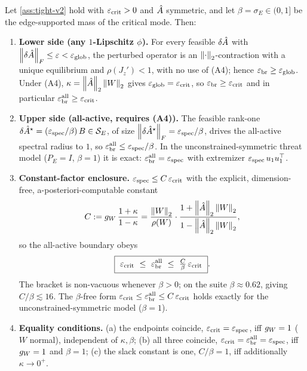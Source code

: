 \begin{theorem}
\label{thm:cf2s_full}
Let \cref{ass:tight-v2} hold with $\varepsilon_{\mathrm{crit}}>0$ and $\hat{A}$ symmetric, and let $\beta=\sigma_E\in(0,1]$ be
the edge-supported mass of the critical mode. Then:
\begin{enumerate}
\item[\textnormal{(i)}] \textbf{Lower side (any $1$-Lipschitz $\phi$).} For every feasible
$\delta\hat{A}$ with $\left\|\delta\hat{A}\right\|_F\le\varepsilon<\varepsilon_{\mathrm{glob}}$, the perturbed operator is an
$\left\|\cdot\right\|_2$-contraction with a unique equilibrium and $\rho(J_z')<1$, with no use of (A4); hence
$\varepsilon_{\mathrm{br}}\ge\varepsilon_{\mathrm{glob}}$. Under (A4), $\kappa=\left\|\hat{A}\right\|_2\left\|W\right\|_2$ gives $\varepsilon_{\mathrm{glob}}=\varepsilon_{\mathrm{crit}}$, so
$\varepsilon_{\mathrm{br}}\ge\varepsilon_{\mathrm{crit}}$ and in particular $\varepsilon_{\mathrm{br}}^{\mathrm{all}}\ge\varepsilon_{\mathrm{crit}}$.

\item[\textnormal{(ii)}] \textbf{Upper side (all-active, requires (A4)).} The feasible rank-one
$\delta\hat{A}^\star=(\varepsilon_{\mathrm{spec}}/\beta)\,B\in\mathcal S_E$, of size $\left\|\delta\hat{A}^\star\right\|_F=\varepsilon_{\mathrm{spec}}/\beta$,
drives the all-active spectral radius to $1$, so $\varepsilon_{\mathrm{br}}^{\mathrm{all}}\le\varepsilon_{\mathrm{spec}}/\beta$. In the
unconstrained-symmetric threat model ($P_E=I$, $\beta=1$) it is exact: $\varepsilon_{\mathrm{br}}^{\mathrm{all}}=\varepsilon_{\mathrm{spec}}$ with
extremizer $\varepsilon_{\mathrm{spec}}\,u_1u_1^\top$.

\item[\textnormal{(iii)}] \textbf{Constant-factor enclosure.} $\varepsilon_{\mathrm{spec}}\le C\,\varepsilon_{\mathrm{crit}}$ with the explicit,
dimension-free, a-posteriori-computable constant
\begin{equation*}
C:=g_W\,\frac{1+\kappa}{1-\kappa}
=\frac{\left\|W\right\|_2}{\rho(W)}\cdot\frac{1+\left\|\hat{A}\right\|_2\left\|W\right\|_2}{1-\left\|\hat{A}\right\|_2\left\|W\right\|_2},
\end{equation*}
so the all-active boundary obeys
\begin{equation}
\boxed{\ \ecrit\ \le\ \ebreakall\ \le\ \tfrac{C}{\beta}\,\ecrit\ }.
\label{eq:bracket_full}
\end{equation}
The bracket is non-vacuous whenever $\beta>0$; on the suite $\beta\approx0.62$, giving
$C/\beta\lesssim16$. The $\beta$-free form $\varepsilon_{\mathrm{crit}}\le\varepsilon_{\mathrm{br}}^{\mathrm{all}}\le C\,\varepsilon_{\mathrm{crit}}$ holds exactly for the
unconstrained-symmetric model ($\beta=1$).

\item[\textnormal{(iv)}] \textbf{Equality conditions.}
(a) the endpoints coincide, $\varepsilon_{\mathrm{crit}}=\varepsilon_{\mathrm{spec}}$, iff $g_W=1$ ($W$ normal), independent of $\kappa,\beta$;
(b) all three coincide, $\varepsilon_{\mathrm{crit}}=\varepsilon_{\mathrm{br}}^{\mathrm{all}}=\varepsilon_{\mathrm{spec}}$, iff $g_W=1$ and $\beta=1$;
(c) the slack constant is one, $C/\beta=1$, iff additionally $\kappa\to0^+$.
\end{enumerate}
\end{theorem}

